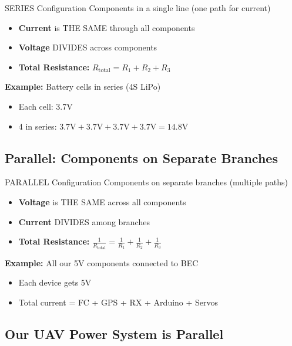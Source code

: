 \documentclass[11pt,letterpaper]{article}
\begin{document}
\begin{conceptbox}{SERIES Configuration}
Components in a single line (one path for current)

\begin{itemize}
  \item \textbf{Current} is THE SAME through all components
  \item \textbf{Voltage} DIVIDES across components
  \item \textbf{Total Resistance:} $R_{\text{total}} = R_1 + R_2 + R_3$
\end{itemize}

\textbf{Example:} Battery cells in series (4S LiPo)
\begin{itemize}
  \item Each cell: 3.7V
  \item 4 in series: $3.7\text{V} + 3.7\text{V} + 3.7\text{V} + 3.7\text{V} = 14.8\text{V}$
\end{itemize}
\end{conceptbox}

\subsection{Parallel: Components on Separate Branches}

\begin{conceptbox}{PARALLEL Configuration}
Components on separate branches (multiple paths)

\begin{itemize}
  \item \textbf{Voltage} is THE SAME across all components
  \item \textbf{Current} DIVIDES among branches
  \item \textbf{Total Resistance:} $\frac{1}{R_{\text{total}}} = \frac{1}{R_1} + \frac{1}{R_2} + \frac{1}{R_3}$
\end{itemize}

\textbf{Example:} All our 5V components connected to BEC
\begin{itemize}
  \item Each device gets 5V
  \item Total current = FC + GPS + RX + Arduino + Servos
\end{itemize}
\end{conceptbox}

\subsection{Our UAV Power System is Parallel}
\end{document}
